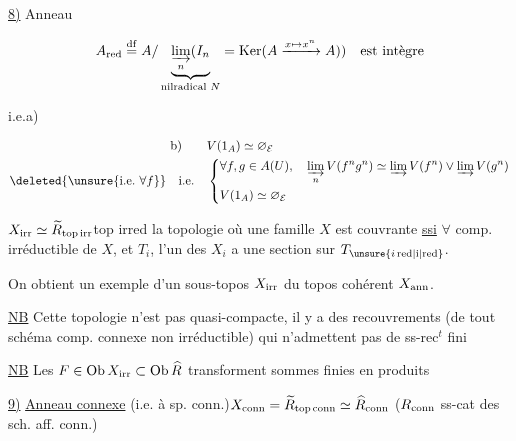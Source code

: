 
\uline{8)} Anneau 

\[
 A_{\rm red}\overset{\rm df}{=}A/\underbrace{\varinjlim_n (I_n}_{\text{nilradical }N}=\operatorname{Ker}(A\xrightarrow{x\mapsto x^n}A))
 \quad\text{est intègre}
\]

i.e.\quad a)

\[
\begin{aligned}
 \mathrm b)\qquad&V(1_A)\simeq\varnothing_{\mathcal E}\\
 \deleted{\unsure{\mathrm{i.e.}\ \forall f}}\quad\text{i.e.}\quad&
 \left\{\begin{aligned}
 &\forall f,g\in A(U),\quad\varinjlim_n V(f^ng^n)\simeq\varinjlim V(f^n)\vee\varinjlim V(g^n)\\
 &V(1_A)\simeq\varnothing_{\mathcal E}
 \end{aligned}\right.
\end{aligned}
\]

$X_{\rm irr}\simeq\widetilde R_{\mathrm{top\,irr}}$\quad top irred la topologie où une famille
$X$ est couvrante \uline{ssi} $\forall$ comp.  irréductible  de $X$,
et   $T_i$, l'un des $X_i$ a une section sur $T_{\unsure{i\,\rm red|i|\rm red}}$.

On obtient un exemple d'un sous-topos $X_{\rm irr}$  du topos cohérent $X_{\rm ann}$.

\uline{NB} Cette topologie n'est pas quasi-compacte, il y a des recouvrements
(de  tout schéma  comp. connexe non  irréductible)
qui n'admettent pas de ss-rec$^t$ fini

\uline{NB} Les $F\in\operatorname{Ob}X_{\rm irr}\subset\operatorname{Ob}\widehat R$ transforment sommes finies en produits

\uline{9)} \uline{Anneau connexe} (i.e. à sp. conn.)\quad $X_{\rm conn}=\widetilde R_{\mathrm{top\,conn}}\simeq\widehat R_{\rm conn}$
($R_{\rm conn}$ ss-cat des sch. aff. conn.)

